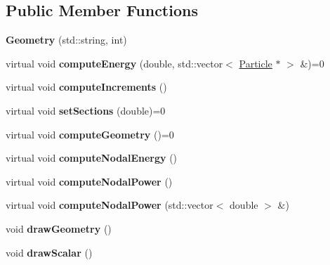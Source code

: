 \subsection*{Public Member Functions}
\begin{CompactItemize}
\item 
\hypertarget{classGeometry_9f0fe2c1f7e8a6b0d6454f5065b4e606}{
\textbf{Geometry} (std::string, int)}
\label{classGeometry_9f0fe2c1f7e8a6b0d6454f5065b4e606}

\item 
\hypertarget{classGeometry_ee462b9ebbf2e943f8199d5ee8facc8c}{
virtual void \textbf{computeEnergy} (double, std::vector$<$ \hyperlink{classParticle}{Particle} $\ast$ $>$ \&)=0}
\label{classGeometry_ee462b9ebbf2e943f8199d5ee8facc8c}

\item 
\hypertarget{classGeometry_63a40c7e8ca800baa0203850bc96b295}{
virtual void \textbf{computeIncrements} ()}
\label{classGeometry_63a40c7e8ca800baa0203850bc96b295}

\item 
\hypertarget{classGeometry_ab2d4db916d7c8541af6624a82b2d4df}{
virtual void \textbf{setSections} (double)=0}
\label{classGeometry_ab2d4db916d7c8541af6624a82b2d4df}

\item 
\hypertarget{classGeometry_3e77ac889d1e440c24efbde630aa1933}{
virtual void \textbf{computeGeometry} ()=0}
\label{classGeometry_3e77ac889d1e440c24efbde630aa1933}

\item 
\hypertarget{classGeometry_8ba01f4e4d4c0bf0860eb948c6567642}{
virtual void \textbf{computeNodalEnergy} ()}
\label{classGeometry_8ba01f4e4d4c0bf0860eb948c6567642}

\item 
\hypertarget{classGeometry_340099102a94c6fcecd1b9a4f34f9d1e}{
virtual void \textbf{computeNodalPower} ()}
\label{classGeometry_340099102a94c6fcecd1b9a4f34f9d1e}

\item 
\hypertarget{classGeometry_f5fa359d8794cc8d54e0aeafdd3a50e3}{
virtual void \textbf{computeNodalPower} (std::vector$<$ double $>$ \&)}
\label{classGeometry_f5fa359d8794cc8d54e0aeafdd3a50e3}

\item 
\hypertarget{classGeometry_4f2e62b82b91402b4f9c8fbf26048974}{
void \textbf{drawGeometry} ()}
\label{classGeometry_4f2e62b82b91402b4f9c8fbf26048974}

\item 
\hypertarget{classGeometry_c19e292e9134717046f74f60ec1f8a97}{
void \textbf{drawScalar} ()}
\label{classGeometry_c19e292e9134717046f74f60ec1f8a97}


\end{CompactItemize}
